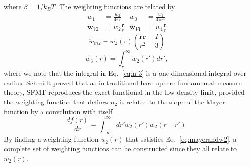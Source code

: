 \documentclass[letterpaper,twocolumn,amsmath,amssymb,prb]{revtex4-1}
\begin{document}
where $\beta = 1/k_BT$. %
The weighting functions are related by
\begin{align}
  w_1 &= \frac{w_2}{4\pi r} &
  w_0 &= \frac{w_2}{4\pi r^2}
  \label{eq:n-0-1}
  \\
  \mathbf{w}_{V2} &= w_2\frac{\textbf{r}}{r} &
  \mathbf{w}_{V1} &= w_1\frac{\textbf{r}}{r}
  \label{eq:n-vectors}
\end{align}
\begin{equation}
  \overleftrightarrow{w}_{m2} = w_2(r)\left(\frac{\mathbf{rr}}{r^2}-\frac{I}{3}\right)
  \label{eq:n-tensor}
\end{equation}
\begin{equation}
   w_3(r) = \int_{r}^{\infty} w_2(r') dr',
  \label{eq:n-3}
\end{equation}
where we note that the integral in Eq.~\ref{eq:n-3} is a
one-dimensional integral over radius. Schmidt proved that as in traditional 
hard-sphere fundamental measure theory, 
SFMT reproduces the exact functional in the low-density limit, provided the 
weighting function that defines $n_2$ is related to the slope of the Mayer 
function by a convolution with itself
\begin{equation}\label{eq:mayerandw2}
  \frac{d f(r)}{dr} = \int_{-\infty}^{\infty} dr' w_2(r') w_2 (r-r').
\end{equation}
By finding a weighting function $w_2(r)$ that satisfies 
Eq.~\ref{eq:mayerandw2}, a complete set of weighting functions
can be constructed since they all relate to $w_2(r)$.
\end{document}

